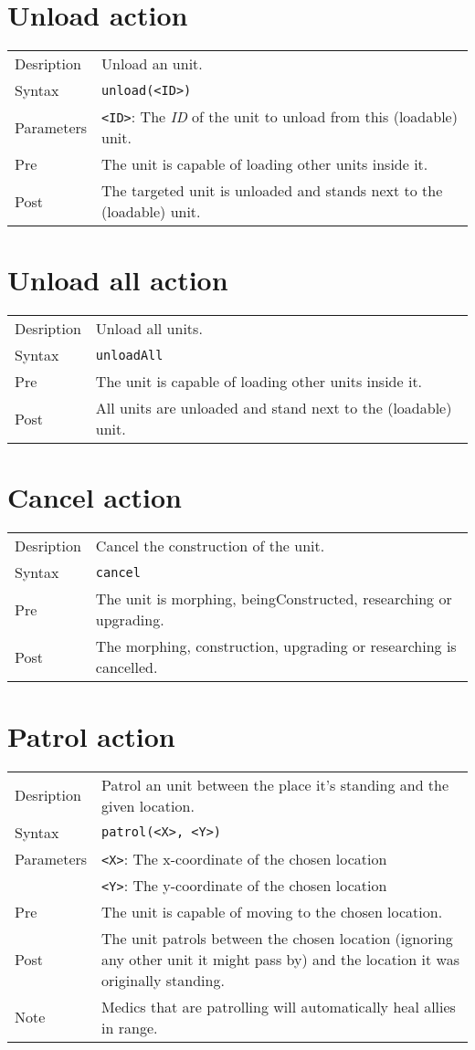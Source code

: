 \section{Unload action}
\begin{tabularx}{\textwidth}{lX}
 Desription & Unload an unit. \\
 Syntax & \verb|unload(<ID>)| \\
 Parameters & \verb|<ID>|: The \textit{ID} of the unit to unload from this (loadable) unit.\\
 Pre & The unit is capable of loading other units inside it. \\
 Post & The targeted unit is unloaded and stands next to the (loadable) unit.
\end{tabularx}

\section{Unload all action}
\begin{tabularx}{\textwidth}{lX}
 Desription & Unload all units. \\
 Syntax & \verb|unloadAll| \\
 Pre & The unit is capable of loading other units inside it. \\
 Post & All units are unloaded and stand next to the (loadable) unit.
\end{tabularx}

\section{Cancel action}
\begin{tabularx}{\textwidth}{lX}
 Desription & Cancel the construction of the unit. \\
 Syntax & \verb|cancel| \\
 Pre & The unit is morphing, beingConstructed, researching or upgrading. \\
 Post & The morphing, construction, upgrading or researching is cancelled.
\end{tabularx}

\section{Patrol action}
\begin{tabularx}{\textwidth}{lX}
 Desription & Patrol an unit between the place it's standing and the given location. \\
 Syntax & \verb|patrol(<X>, <Y>)| \\
 Parameters & \verb|<X>|: The x-coordinate of the chosen location \\
            &  \verb|<Y>|: The y-coordinate of the chosen location \\
 Pre & The unit is capable of moving to the chosen location. \\
 Post & The unit patrols between the chosen location (ignoring any other unit it might pass by) and the location it was originally standing.\\
 Note & Medics that are patrolling will automatically heal allies in range.
\end{tabularx}

